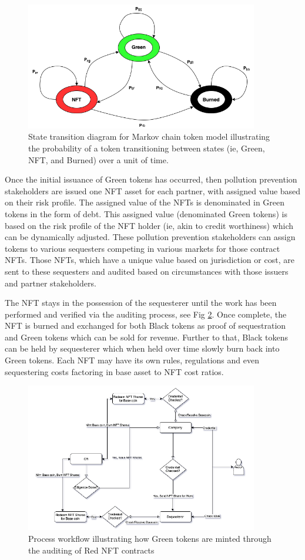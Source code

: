 \documentclass{article}
\begin{document}
\begin{figure}[h]
\centering
\includegraphics[width=4in]{state_diagram.png}
\caption{State transition diagram for Markov chain token model illustrating the probability of a token transitioning between states (ie, Green, NFT, and Burned) over a unit of time.} 
\label{fig:state_diagram}
\end{figure} 

Once the initial issuance of Green tokens has occurred, then pollution prevention stakeholders are issued one NFT asset for each partner, with assigned value based on their risk profile. The assigned value of the NFTs is denominated in Green tokens in the form of debt. This assigned value (denominated Green tokens) is based on the risk profile of the NFT holder (ie, akin to credit worthiness) which can be dynamically adjusted. These  pollution prevention stakeholders can assign tokens to various sequesters competing in various markets for those contract NFTs. Those NFTs, which have a unique value based on jurisdiction or cost, are sent to these sequesters and audited based on circumstances with those issuers and partner stakeholders.

The NFT stays in the possession of the sequesterer until the work has been performed and verified via the auditing process, see Fig \ref{fig:red_to_green}. Once complete, the NFT is burned and exchanged for both Black tokens as proof of sequestration and Green tokens which can be sold for revenue. Further to that, Black tokens can be held by sequesterer which when held over time slowly burn back into Green tokens. Each NFT may have its own rules, regulations and even sequestering costs factoring in base asset to NFT cost ratios.

\begin{figure}[h]
\centering
\includegraphics[width=4in]{red_to_green.png}
\caption{ Process workflow illustrating how Green tokens are minted through the auditing of Red NFT contracts } 
\label{fig:red_to_green}
\end{figure} 
\end{document}
